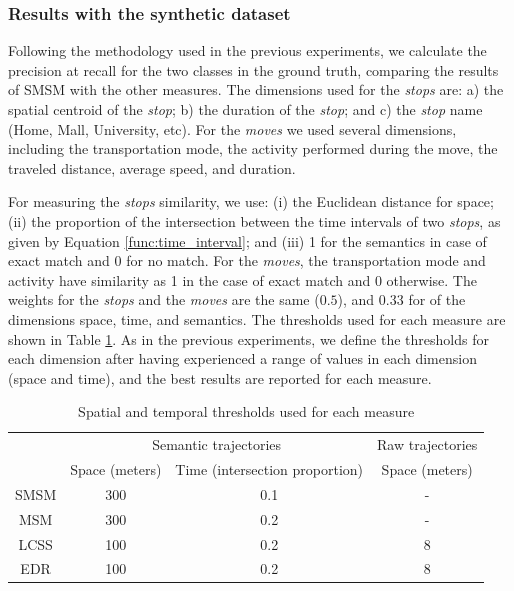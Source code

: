 \subsubsection{Results with the synthetic dataset}
{Following the methodology used in the previous experiments, we calculate the precision at recall for the two classes in the ground truth, comparing the results of SMSM with the other measures. The dimensions used for the \emph{stops} are: a) the spatial centroid of the \emph{stop}; b) the duration of the \emph{stop}; and c) the \emph{stop} name (Home, Mall, University, etc). For the \emph{moves} we used several dimensions, including  the transportation mode, the activity performed during the move, the traveled distance, average speed, and duration.}

{For measuring the \emph{stops} similarity, we use: (i) the Euclidean distance for space; (ii) the proportion of the intersection between the time intervals of two \emph{stops}, as given by Equation {\ref{func:time_interval}}; and (iii) 1 for the semantics in case of exact match and 0 for no match. For the \emph{moves}, the transportation mode and activity have  similarity as 1 in the case of exact match and 0 otherwise. The weights for the \emph{stops} and the \emph{moves} are the same ($0.5$), and $0.33$ for of the  dimensions space, time, and semantics. The thresholds used for each measure are shown in Table {\ref{tab:hermoupolis_thresholds}}.  As in the previous experiments, we define the thresholds for each dimension after having experienced a range of values in each dimension (space and time), and the best results are reported for each measure.}

\begin{table}[!h]
\scriptsize
  \centering
  \begin{tabular}{|c|c|c|c|}
  \hline
  & \multicolumn{2}{c|}{Semantic trajectories} & \multicolumn{1}{c|}{Raw trajectories} \\
 	\cline{2-4}
  & Space (meters)& Time (intersection proportion) & Space (meters) \\
  \hline
 SMSM & 300 & 0.1 & - \\
 MSM & 300 & 0.2 & - \\
 LCSS & 100 & 0.2 & 8 \\
 EDR & 100 & 0.2 & 8 \\
    \hline
  \end{tabular}
  \caption{Spatial and temporal thresholds used for each measure}
  \label{tab:hermoupolis_thresholds}
\end{table}

